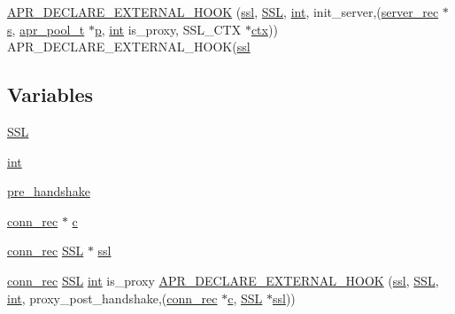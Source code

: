\begin{DoxyCompactItemize}
\item 
\hyperlink{group__MOD__SSL_ga1a722372d95d9b40ca6ed2fcd1c319f7}{A\+P\+R\+\_\+\+D\+E\+C\+L\+A\+R\+E\+\_\+\+E\+X\+T\+E\+R\+N\+A\+L\+\_\+\+H\+O\+OK} (\hyperlink{group__MOD__SSL_ga91d808d6c1c01029f9c9260b9b69a437}{ssl}, \hyperlink{group__MOD__SSL_gac05889312301718b3fc106564942ad68}{S\+SL}, \hyperlink{pcre_8txt_a42dfa4ff673c82d8efe7144098fbc198}{int}, init\+\_\+server,(\hyperlink{structserver__rec}{server\+\_\+rec} $\ast$\hyperlink{pcretest_8txt_a062597889ba244b72877454b1d3adecf}{s}, \hyperlink{structapr__pool__t}{apr\+\_\+pool\+\_\+t} $\ast$\hyperlink{group__APACHE__CORE__MPM_ga5cd91701e5c167f2b1a38e70ab57817e}{p}, \hyperlink{pcre_8txt_a42dfa4ff673c82d8efe7144098fbc198}{int} is\+\_\+proxy, S\+S\+L\+\_\+\+C\+TX $\ast$\hyperlink{group__APR__Util__Bucket__Brigades_ga0525238c5b09cb4ac5067ddec654d09c}{ctx})) A\+P\+R\+\_\+\+D\+E\+C\+L\+A\+R\+E\+\_\+\+E\+X\+T\+E\+R\+N\+A\+L\+\_\+\+H\+O\+OK(\hyperlink{group__MOD__SSL_ga91d808d6c1c01029f9c9260b9b69a437}{ssl}
\end{DoxyCompactItemize}
\subsection*{Variables}
\begin{DoxyCompactItemize}
\item 
\hyperlink{group__MOD__SSL_gac05889312301718b3fc106564942ad68}{S\+SL}
\item 
\hyperlink{group__MOD__SSL_ga61569f2965b7a369eb10b6d75d410d11}{int}
\item 
\hyperlink{group__MOD__SSL_gad489fb2d7495c0ac1b9381c2acde1801}{pre\+\_\+handshake}
\item 
\hyperlink{structconn__rec}{conn\+\_\+rec} $\ast$ \hyperlink{group__MOD__SSL_ga836f65c6714b5c90becd1203d4c1048b}{c}
\item 
\hyperlink{structconn__rec}{conn\+\_\+rec} \hyperlink{group__MOD__SSL_gac05889312301718b3fc106564942ad68}{S\+SL} $\ast$ \hyperlink{group__MOD__SSL_ga91d808d6c1c01029f9c9260b9b69a437}{ssl}
\item 
\hyperlink{structconn__rec}{conn\+\_\+rec} \hyperlink{group__MOD__SSL_gac05889312301718b3fc106564942ad68}{S\+SL} \hyperlink{pcre_8txt_a42dfa4ff673c82d8efe7144098fbc198}{int} is\+\_\+proxy \hyperlink{group__MOD__SSL_ga1974aa2299d4bf1fc45114a611d847a1}{A\+P\+R\+\_\+\+D\+E\+C\+L\+A\+R\+E\+\_\+\+E\+X\+T\+E\+R\+N\+A\+L\+\_\+\+H\+O\+OK} (\hyperlink{group__MOD__SSL_ga91d808d6c1c01029f9c9260b9b69a437}{ssl}, \hyperlink{group__MOD__SSL_gac05889312301718b3fc106564942ad68}{S\+SL}, \hyperlink{pcre_8txt_a42dfa4ff673c82d8efe7144098fbc198}{int}, proxy\+\_\+post\+\_\+handshake,(\hyperlink{structconn__rec}{conn\+\_\+rec} $\ast$\hyperlink{pcregrep_8txt_aef720ae5f62fa015619d00171d917416}{c}, \hyperlink{group__MOD__SSL_gac05889312301718b3fc106564942ad68}{S\+SL} $\ast$\hyperlink{group__MOD__SSL_ga91d808d6c1c01029f9c9260b9b69a437}{ssl}))
\end{DoxyCompactItemize}


